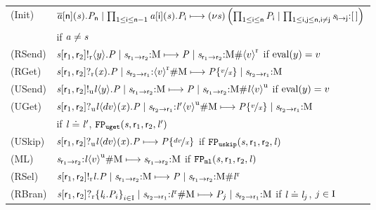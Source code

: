 \begin{figure}[tp]
    \centering
	\renewcommand{\tabcolsep}{2pt}
	\begin{tabular}{ll}
		(\textsf{Init}) & $ \PReq{\Chan[a]}{\Role[n]}{\Chan}{\PT_{\Role[n]}} \mid \prod_{1 \leq \Role[i] \leq \Role[n] - 1} \PAcc{\Chan[a]}{\Role[i]}{\Chan}{\PT_{\Role[i]}} \step \PRes{\Chan}{\left( \prod_{1 \leq \Role[i] \leq \Role[n]} \PT_{\Role[i]} \mid \prod_{1 \leq \Role[i], \Role[j] \leq \Role[n], \Role[i] \neq \Role[j]} \MQ{\Chan}{\Role[i]}{\Role[j]}{\emptyList} \right)} $\\
		& \hfill if $ \Chan[a] \neq \Chan $\\
		(\textsf{RSend}) & $ \PSendR{\Chan}{\Role_1}{\Role_2}{\Expr[y]}{\PT} \mid \MQ{\Chan}{\Role_1}{\Role_2}{\Queue} \step \PT \mid \MQ{\Chan}{\Role_1}{\Role_2}{\Queue\#\MessR{\Expr[v]}} $ \hfill if $ \Eval{\Expr[y]} = \Expr[v] $\\
		(\textsf{RGet}) & $ \PGetR{\Chan}{\Role_1}{\Role_2}{\Args}{\PT} \mid \MQ{\Chan}{\Role_2}{\Role_1}{\MessR{\Expr[v]}\#\Queue} \step \PT\Subst{\Expr[v]}{\Args} \mid \MQ{\Chan}{\Role_2}{\Role_1}{\Queue} $\\
		(\textsf{USend}) & $ \PSendU{\Chan}{\Role_1}{\Role_2}{\Label}{\Expr[y]}{\PT} \mid \MQ{\Chan}{\Role_1}{\Role_2}{\Queue} \step \PT \mid \MQ{\Chan}{\Role_1}{\Role_2}{\Queue\#\MessU{\Label}{\Expr[v]}} $ \hfill if $ \Eval{\Expr[y]} = \Expr[v] $\\
		(\textsf{UGet}) & $ \PGetU{\Chan}{\Role_1}{\Role_2}{\Label}{\Expr[dv]}{\Args}{\PT} \mid \MQ{\Chan}{\Role_2}{\Role_1}{\MessU{\Label'}{\Expr[v]}\#\Queue} \step \PT\Subst{\Expr[v]}{\Args} \mid \MQ{\Chan}{\Role_2}{\Role_1}{\Queue} $\\
		& \hfill if $ \Label \compL \Label' $, $ \fpUGet(\Chan, \Role_1, \Role_2, \Label') $\\
		(\textsf{USkip}) & $ \PGetU{\Chan}{\Role_1}{\Role_2}{\Label}{\Expr[dv]}{\Args}{\PT} \step \PT\Subst{\Expr[dv]}{\Args} $ \hfill if $ \fpUSkip(\Chan, \Role_1, \Role_2, \Label) $\\
		(\textsf{ML}) & $ \MQ{\Chan}{\Role_1}{\Role_2}{\MessU{\Label}{\Expr[v]}\#\Queue} \step \MQ{\Chan}{\Role_1}{\Role_2}{\Queue} $ \hfill if $ \fpML(\Chan, \Role_1, \Role_2, \Label) $\\
		(\textsf{RSel}) & $ \PSelR{\Chan}{\Role_1}{\Role_2}{\Label}{\PT} \mid \MQ{\Chan}{\Role_1}{\Role_2}{\Queue} \step \PT \mid \MQ{\Chan}{\Role_1}{\Role_2}{\Queue\#\MessBR{\Label}} $\\
		(\textsf{RBran}) & $ \PBranR{\Chan}{\Role_1}{\Role_2}{\Set{ \Label_i.\PT_i }_{i \in \indexSet}} \mid \MQ{\Chan}{\Role_2}{\Role_1}{\MessBR{\Label}\#\Queue} \step \PT_j \mid \MQ{\Chan}{\Role_2}{\Role_1}{\Queue} $ \hfill if $ \Label \compL \Label_j $, $ j \in \indexSet $\\

\end{tabular}
\end{figure}
